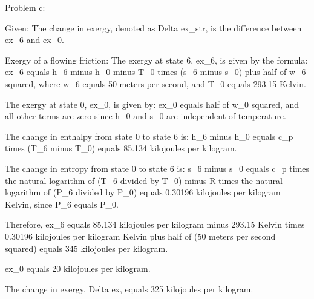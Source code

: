 Problem c:

Given: The change in exergy, denoted as Delta ex_str, is the difference between ex_6 and ex_0.

Exergy of a flowing friction:
The exergy at state 6, ex_6, is given by the formula:
ex_6 equals h_6 minus h_0 minus T_0 times (s_6 minus s_0) plus half of w_6 squared,
where w_6 equals 50 meters per second, and T_0 equals 293.15 Kelvin.

The exergy at state 0, ex_0, is given by:
ex_0 equals half of w_0 squared,
and all other terms are zero since h_0 and s_0 are independent of temperature.

The change in enthalpy from state 0 to state 6 is:
h_6 minus h_0 equals c_p times (T_6 minus T_0) equals 85.134 kilojoules per kilogram.

The change in entropy from state 0 to state 6 is:
s_6 minus s_0 equals c_p times the natural logarithm of (T_6 divided by T_0) minus R times the natural logarithm of (P_6 divided by P_0) equals 0.30196 kilojoules per kilogram Kelvin, since P_6 equals P_0.

Therefore, ex_6 equals 85.134 kilojoules per kilogram minus 293.15 Kelvin times 0.30196 kilojoules per kilogram Kelvin plus half of (50 meters per second squared) equals 345 kilojoules per kilogram.

ex_0 equals 20 kilojoules per kilogram.

The change in exergy, Delta ex, equals 325 kilojoules per kilogram.